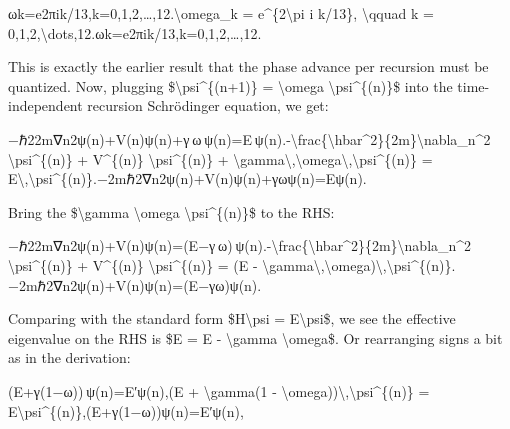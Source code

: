 \documentclass[
]{article}
\begin{document}
ωk=e2πik/13,k=0,1,2,\ldots,12.\textbackslash omega\_k =
e\^{}\{2\textbackslash pi i k/13\}, \textbackslash qquad k =
0,1,2,\textbackslash dots,12.ωk\hspace{0pt}=e2πik/13,k=0,1,2,\ldots,12.\hspace{0pt}

This is exactly the earlier result that the phase advance per recursion
must be quantized. Now, plugging \$\textbackslash psi\^{}\{(n+1)\} =
\textbackslash omega \textbackslash psi\^{}\{(n)\}\$ into the
time-independent recursion Schrödinger equation, we get:

−ℏ22m∇n2ψ(n)+V(n)ψ(n)+γ ω ψ(n)=E ψ(n).-\textbackslash frac\{\textbackslash hbar\^{}2\}\{2m\}\textbackslash nabla\_n\^{}2
\textbackslash psi\^{}\{(n)\} + V\^{}\{(n)\}
\textbackslash psi\^{}\{(n)\} +
\textbackslash gamma\textbackslash,\textbackslash omega\textbackslash,\textbackslash psi\^{}\{(n)\}
=
E\textbackslash,\textbackslash psi\^{}\{(n)\}.−2mℏ2\hspace{0pt}∇n2\hspace{0pt}ψ(n)+V(n)ψ(n)+γωψ(n)=Eψ(n).

Bring the \$\textbackslash gamma \textbackslash omega
\textbackslash psi\^{}\{(n)\}\$ to the RHS:

−ℏ22m∇n2ψ(n)+V(n)ψ(n)=(E−γ ω) ψ(n).-\textbackslash frac\{\textbackslash hbar\^{}2\}\{2m\}\textbackslash nabla\_n\^{}2
\textbackslash psi\^{}\{(n)\} + V\^{}\{(n)\}
\textbackslash psi\^{}\{(n)\} = (E -
\textbackslash gamma\textbackslash,\textbackslash omega)\textbackslash,\textbackslash psi\^{}\{(n)\}.−2mℏ2\hspace{0pt}∇n2\hspace{0pt}ψ(n)+V(n)ψ(n)=(E−γω)ψ(n).\hspace{0pt}

Comparing with the standard form \$H\textbackslash psi =
E\textquotesingle\textbackslash psi\$, we see the effective eigenvalue
on the RHS is \$E\textquotesingle{} = E - \textbackslash gamma
\textbackslash omega\$. Or rearranging signs a bit as in the derivation:

(E+γ(1−ω)) ψ(n)=E′ψ(n),(E + \textbackslash gamma(1 -
\textbackslash omega))\textbackslash,\textbackslash psi\^{}\{(n)\} =
E\textquotesingle\textbackslash psi\^{}\{(n)\},(E+γ(1−ω))ψ(n)=E′ψ(n),
\end{document}
